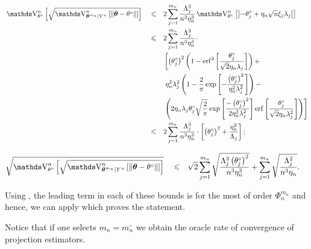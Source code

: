 \begin{pro}
\begin{alignat*}{3}
&\V_{\theta^{\circ}}^{n}\left[\sqrt{\V_{\boldsymbol{\theta}^{m_{n}} \vert Y^{n}}^{n}\left[\Vert \boldsymbol{\theta} - \theta^{\circ} \Vert\right]}\right] && \leq && 2 \sum\limits_{j = 1}^{m_{n}} \frac{\Lambda_{j}^{3}}{n^{3} \eta_{n}^{3}} \V_{\theta^{\circ}}^{n}\left[\left\vert- \theta^{\circ}_{j} + \eta_{n} \sqrt{n} \xi_{j} \lambda_{j}\right\vert\right]\\
& && \leq && 2 \sum\limits_{j = 1}^{m_{n}} \frac{\Lambda_{j}^{3}}{n^{3} \eta_{n}^{3}} \cdot\\
& && &&\left[\left(\theta_{j}^{\circ}\right)^{2}\left(1 - \erf^{2}\left[\frac{\theta_{j}^{\circ}}{\sqrt{2} \eta_{n} \lambda_{j}}\right]\right) + \right.\\
& && && \left. \eta_{n}^{2} \lambda_{j}^{2} \left( 1 - \frac{2}{\pi} \exp\left[- \frac{\left(\theta_{j}^{\circ}\right)^{2}}{\eta_{n}^{2} \lambda_{j}^{2}}\right]\right) - \right.\\
& && && \left. \left(2 \eta_{n} \lambda_{j} \theta_{j}^{\circ} \sqrt{\frac{2}{\pi}} \exp\left[\frac{- \left(\theta_{j}^{\circ}\right)^{2}}{2 \eta_{n}^{2} \lambda_{j}^{2}}\right] \erf\left[\frac{\theta_{j}^{\circ}}{\sqrt{2} \eta_{n} \lambda_{j}^{2}}\right]\right)\right]\\
& && \leq && 2 \sum\limits_{j = 1}^{m_{n}} \frac{\Lambda_{j}^{3}}{n^{3} \eta_{n}^{3}} \cdot \left[ \left(\theta_{j}^{\circ}\right)^{2} + \frac{\eta_{n}^{2}}{\Lambda_{j}}\right] ;
\end{alignat*}

\begin{alignat*}{3}
&\sqrt{\V_{\theta^{\circ}}^{n}\left[\sqrt{\V_{\boldsymbol{\theta}^{m_{n}} \vert Y^{n}}^{n}\left[\Vert \boldsymbol{\theta} - \theta^{\circ} \Vert\right]}\right]} &&\leq&& \sqrt{2} \sum\limits_{j = 1}^{m_{n}} \sqrt{\frac{\Lambda_{j}^{3}\left(\theta_{j}^{\circ}\right)^{2}}{n^{3} \eta_{n}^{3}}} + \sum\limits_{j = 1}^{m_{n}} \sqrt{\frac{\Lambda_{j}^{2}}{n^{3} \eta_{n}}}.
\end{alignat*}

Using , the leading term in each of these bounds is for the most of order $\Phi_{n}^{m_{n}}$ and hence, we can apply  which proves the statement.
\qedsymbol
\end{pro}

Notice that if one selects $m_{n} = m_{n}^{\circ}$ we obtain the oracle rate of convergence of projection estimators.

